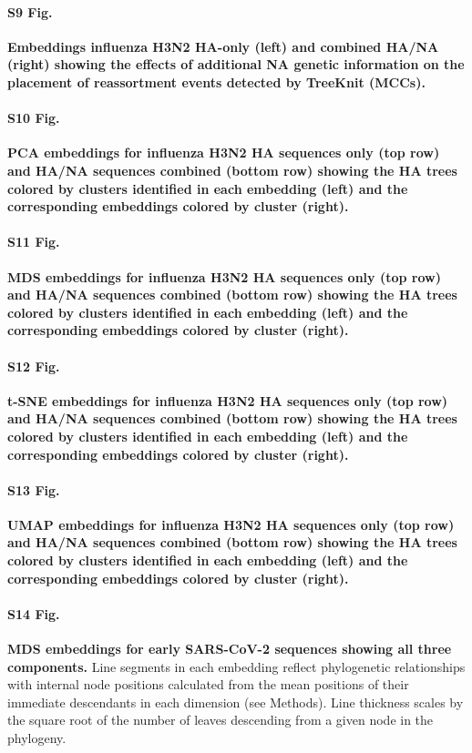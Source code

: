 \documentclass[10pt,letterpaper]{article}
\begin{document}
\paragraph*{S9 Fig.}
\label{S_Fig_full_ha_na_embeddings}
{\bf Embeddings influenza H3N2 HA-only (left) and combined HA/NA (right) showing the effects of additional NA genetic information on the placement of reassortment events detected by TreeKnit (MCCs).}

\paragraph*{S10 Fig.}
\label{S_Fig_flu_ha_na_pca_embeddings}
{\bf PCA embeddings for influenza H3N2 HA sequences only (top row) and HA/NA sequences combined (bottom row) showing the HA trees colored by clusters identified in each embedding (left) and the corresponding embeddings colored by cluster (right).}

\paragraph*{S11 Fig.}
\label{S_Fig_flu_ha_na_mds_embeddings}
{\bf MDS embeddings for influenza H3N2 HA sequences only (top row) and HA/NA sequences combined (bottom row) showing the HA trees colored by clusters identified in each embedding (left) and the corresponding embeddings colored by cluster (right).}

\paragraph*{S12 Fig.}
\label{S_Fig_flu_ha_na_tsne_embeddings}
{\bf t-SNE embeddings for influenza H3N2 HA sequences only (top row) and HA/NA sequences combined (bottom row) showing the HA trees colored by clusters identified in each embedding (left) and the corresponding embeddings colored by cluster (right).}

\paragraph*{S13 Fig.}
\label{S_Fig_flu_ha_na_umap_embeddings}
{\bf UMAP embeddings for influenza H3N2 HA sequences only (top row) and HA/NA sequences combined (bottom row) showing the HA trees colored by clusters identified in each embedding (left) and the corresponding embeddings colored by cluster (right).}

\paragraph*{S14 Fig.}
\label{S_Fig_sarscov2_early_mds}
{\bf MDS embeddings for early SARS-CoV-2 sequences showing all three components.}
Line segments in each embedding reflect phylogenetic relationships with internal node positions calculated from the mean positions of their immediate descendants in each dimension (see Methods).
Line thickness scales by the square root of the number of leaves descending from a given node in the phylogeny.
\end{document}
